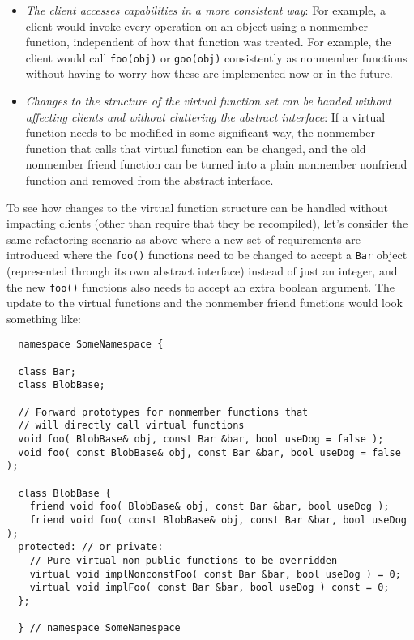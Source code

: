 \documentclass[pdf,ps2pdf,11pt]{SANDreport}
\begin{document}
\begin{itemize}

{}\item\textit{The client accesses capabilities in a more consistent way}: For
example, a client would invoke every operation on an object using a nonmember
function, independent of how that function was treated.  For example, the
client would call {}\texttt{foo(obj)} or {}\texttt{goo(obj)} consistently as
nonmember functions without having to worry how these are implemented now or
in the future.

{}\item\textit{Changes to the structure of the virtual function set can be
handed without affecting clients and without cluttering the abstract
interface}: If a virtual function needs to be modified in some significant
way, the nonmember function that calls that virtual function can be changed,
and the old nonmember friend function can be turned into a plain nonmember
nonfriend function and removed from the abstract interface.

\end{itemize}

To see how changes to the virtual function structure can be handled without
impacting clients (other than require that they be recompiled), let's consider
the same refactoring scenario as above where a new set of requirements are
introduced where the {}\texttt{foo()} functions need to be changed to accept a
{}\texttt{Bar} object (represented through its own abstract interface) instead
of just an integer, and the new {}\texttt{foo()} functions also needs to
accept an extra boolean argument.  The update to the virtual functions and the
nonmember friend functions would look something like:

{\small\begin{verbatim}
  namespace SomeNamespace {

  class Bar;
  class BlobBase;

  // Forward prototypes for nonmember functions that
  // will directly call virtual functions
  void foo( BlobBase& obj, const Bar &bar, bool useDog = false );
  void foo( const BlobBase& obj, const Bar &bar, bool useDog = false );

  class BlobBase {
    friend void foo( BlobBase& obj, const Bar &bar, bool useDog );
    friend void foo( const BlobBase& obj, const Bar &bar, bool useDog );
  protected: // or private:
    // Pure virtual non-public functions to be overridden
    virtual void implNonconstFoo( const Bar &bar, bool useDog ) = 0;
    virtual void implFoo( const Bar &bar, bool useDog ) const = 0;
  };

  } // namespace SomeNamespace
\end{verbatim}}
\end{document}
